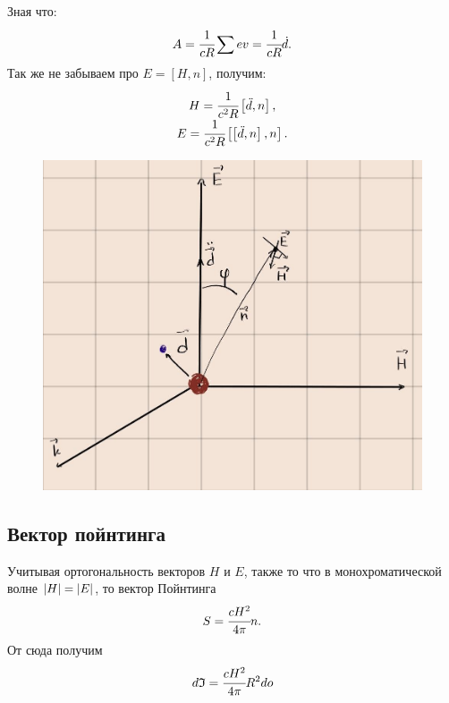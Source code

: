 \documentclass[a4paper]{article}
\newcommand{\insqr}[1]{\left[ #1 \right]}
\numberwithin{equation}{section}
\begin{document}
Зная что:
\begin{equation}
    A = \cfrac{1}{cR} \sum ev = \cfrac{1}{cR} \dot d.
\end{equation}
Так же не забываем про $E = \insqr{H, n}$, получим:
\begin{eqnarray}
    \begin{matrix}
        H = \cfrac{1}{c^2R}\insqr{\ddot d, n}, \\
        E = \cfrac{1}{c^2R}\insqr{\insqr{\ddot d, n}, n}.
    \end{matrix}
    \label{eq:2.5}
\end{eqnarray}
\begin{figure}[h]
    \centering
    \includegraphics[trim={0 0 0 0},clip,width=\textwidth]{sh.jpg}
    \label{pict}
\end{figure}

\subsection{Вектор пойнтинга}
Учитывая ортогональность векторов $H$ и $E$, также то что в 
монохроматической волне $\abs{H} = \abs{E}$, то вектор Пойнтинга
\begin{equation}
    S = \cfrac{cH^2}{4\pi}n.
\end{equation}
От сюда получим 
\begin{equation}
    d\mathfrak{I} = \cfrac{cH^2}{4\pi}R^2do
    \label{eq:2.7}
\end{equation}
\end{document}
